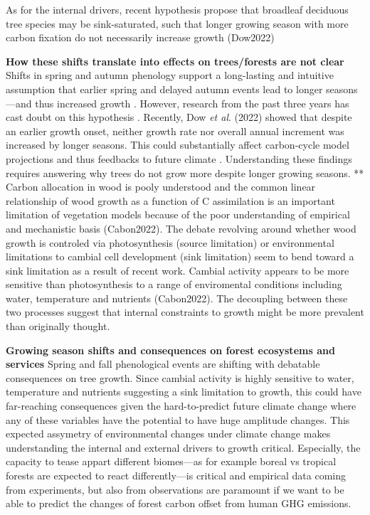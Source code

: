 \documentclass{article}
\begin{document}
As for the internal drivers, recent hypothesis propose that broadleaf deciduous tree species may be sink-saturated, such that longer growing season with more carbon fixation do not necessarily increase growth (Dow2022)

\textbf{How these shifts translate into effects on trees/forests are not clear}
Shifts in spring and autumn phenology support a long-lasting and intuitive assumption that earlier spring and delayed autumn events lead to longer seasons---and thus increased growth \cite{keenan_net_2014}. However, research from the past three years has cast doubt on this hypothesis \cite{dow_warm_2022,green_limits_2022,silvestro_longer_2023}. Recently, Dow \textit{et al}. (2022) showed that despite an earlier growth onset, neither growth rate nor overall annual increment was increased by longer seasons. This could substantially affect carbon-cycle model projections and thus feedbacks to future climate \cite{richardson_climate_2013,swidrak_comparing_2013}. 
Understanding these findings requires answering why trees do not grow more despite longer growing seasons. ** Carbon allocation in wood is pooly understood and the common linear relationship of wood growth as a function of C assimilation is an important limitation of vegetation models because of the poor understanding of empirical and mechanistic basis (Cabon2022). The debate revolving around whether wood growth is controled via photosynthesis (source limitation) or environmental limitations to cambial cell development (sink limitation) seem to bend toward a sink limitation as a result of recent work. Cambial activity appears to be more sensitive than photosynthesis to a range of enviromental conditions including water, temperature and nutrients (Cabon2022). The decoupling between these two processes suggest that internal constraints to growth might be more prevalent than originally thought.

\textbf{Growing season shifts and consequences on forest ecosystems and services}
Spring and fall phenological events are shifting with debatable consequences on tree growth. Since cambial activity is highly sensitive to water, temperature and nutrients suggesting a sink limitation to growth, this could have far-reaching consequences given the hard-to-predict future climate change where any of these variables have the potential to have huge amplitude changes. This expected assymetry of environmental changes under climate change makes understanding the internal and external drivers to growth critical. Especially, the capacity to tease appart different biomes---as for example boreal vs tropical forests are expected to react differently---is critical and empirical data coming from experiments, but also from observations are paramount if we want to be able to predict the changes of forest carbon offset from human GHG emissions.  
\end{document}
